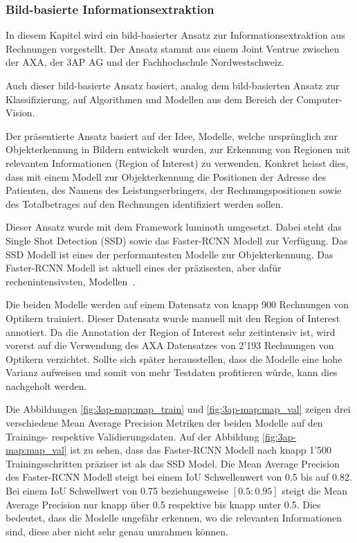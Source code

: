\subsubsection{Bild-basierte Informationsextraktion}

In diesem Kapitel wird ein bild-basierter Ansatz zur Informationsextraktion aus Rechnungen vorgestellt. Der Ansatz stammt aus einem Joint Ventrue zwischen der AXA, der 3AP AG und der Fachhochschule Nordwestschweiz. 

Auch dieser bild-basierte Ansatz basiert, analog dem bild-basierten Ansatz zur Klassifizierung, auf Algorithmen und Modellen aus dem Bereich der Computer-Vision.

Der präsentierte Ansatz basiert auf der Idee, Modelle, welche ursprünglich zur Objekterkennung in Bildern entwickelt wurden, zur Erkennung von Regionen mit relevanten Informationen (Region of Interest) zu verwenden. Konkret heisst dies, dass mit einem Modell zur Objekterkennung die Positionen der Adresse des Patienten, des Namens des Leistungserbringers, der Rechnungspositionen sowie des Totalbetrages auf den Rechnungen identifiziert werden sollen. 

Dieser Ansatz wurde mit dem Framework luminoth umgesetzt. Dabei steht das Single Shot Detection (SSD) sowie das Faster-RCNN Modell zur Verfügung. Das SSD Modell ist eines der performantesten Modelle zur Objekterkennung. Das Faster-RCNN Modell ist aktuell eines der präzisesten, aber dafür rechenintensivsten, Modellen~\autocite{SSDFRCNN}.

Die beiden Modelle werden auf einem Datensatz von knapp 900 Rechnungen von Optikern trainiert. Dieser Datensatz wurde manuell mit den Region of Interest annotiert. Da die Annotation der Region of Interest sehr zeitintensiv ist, wird vorerst auf die Verwendung des AXA Datensatzes von 2'193 Rechnungen von Optikern verzichtet. Sollte sich später herausstellen, dass die Modelle eine hohe Varianz aufweisen und somit von mehr Testdaten profitieren würde, kann dies nachgeholt werden.

Die Abbildungen \ref{fig:3ap-map:map_train} und \ref{fig:3ap-map:map_val} zeigen drei verschiedene Mean Average Precision Metriken der beiden Modelle auf den Trainings- respektive Validierungsdaten. Auf der Abbildung \ref{fig:3ap-map:map_val} ist zu sehen, dass das Faster-RCNN Modell nach knapp 1'500 Trainingsschritten präziser ist als das SSD Model. Die Mean Average Precision des Faster-RCNN Modell steigt bei einem IoU Schwellenwert von 0.5 bis auf 0.82. Bei einem IoU Schwellwert von 0.75 beziehungsweise $[0.5:0.95]$ steigt die Mean Average Precision nur knapp über 0.5 respektive bis knapp unter 0.5. Dies bedeutet, dass die Modelle ungefähr erkennen, wo die relevanten Informationen sind, diese aber nicht sehr genau umrahmen können.

